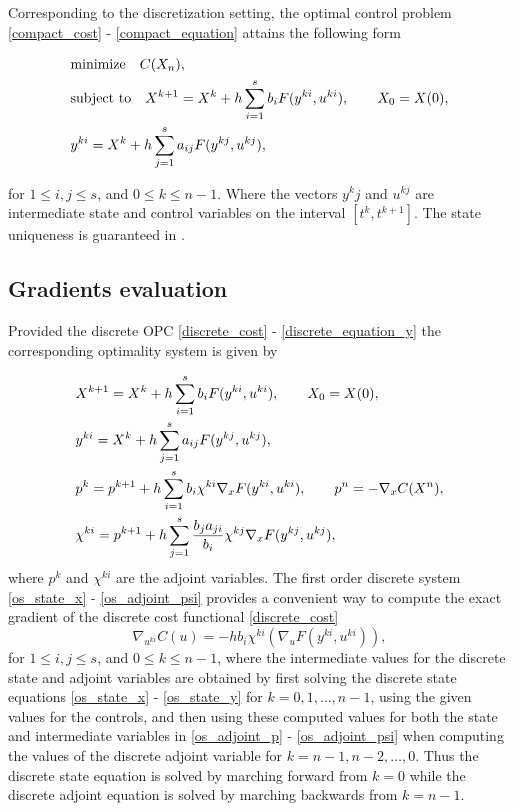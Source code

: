 \documentclass[a4paper, english]{article}
\newcommand{\D}{\displaystyle}
\begin{document}
 Corresponding to the discretization setting, the optimal control problem \eqref{compact_cost} -  \eqref{compact_equation}  attains the following form

 \begin{align}
  \D
  & \mbox{minimize}\quad C(X_n), \label{discrete_cost}\\
  & \mbox{subject to} \quad X^{k+1}  = X^k + h\sum_{i=1}^{s}b_iF(y^{ki}, u^{ki}), \qquad X_0 = X(0), \label{discrete_equation_x}\\
  & y^{ki} = X^k + h\sum_{j=1}^{s}a_{ij}F(y^{kj}, u^{kj}),\label{discrete_equation_y}
  \end{align}

 for $1\leq i, j\leq s$, and $0\leq k\leq n-1$.
 Where the vectors $y^kj$ and $u^{kj}$ are intermediate state and control variables on the interval $[t^k, t^{k+1}]$. The state uniqueness is guaranteed in \cite{Hager2000}.


\subsection{Gradients evaluation}
Provided the discrete OPC \eqref{discrete_cost} - \eqref{discrete_equation_y} the corresponding  optimality system  is given by

  \begin{align}
   \D
    & X^{k+1}  = X^k + h\sum_{i=1}^{s}b_iF(y^{ki}, u^{ki}), \qquad X_0 = X(0),   \label{os_state_x}\\
 	& y^{ki} = X^k + h\sum_{j=1}^{s}a_{ij}F(y^{kj}, u^{kj}),   \label{os_state_y}\\
 	& p^k = p^{k+1} + h\sum_{i=1}^{s}b_i \chi^{ki}\nabla_x F(y^{ki}, u^{ki}), \qquad p^n = - \nabla_xC(X^n),  \label{os_adjoint_p}\\
 	& \chi^{ki} = p^{k+1} + h\sum_{j=1}^{s} \frac{b_j a_{ji}}{b_i}\chi^{kj}\nabla_x F(y^{kj}, u^{kj}), \label{os_adjoint_psi}
   \end{align}
where $p^k$ and $\chi^{ki}$ are the adjoint variables.
The first order discrete system \eqref{os_state_x} - \eqref{os_adjoint_psi} provides a convenient way to compute the exact gradient of the discrete cost functional \eqref{discrete_cost}
\begin{equation}
\nabla_{u^{ki}} C(u) = -h b_i \chi^{ki} (\nabla_u F(y^{ki}, u^{ki})),
\label{discretegradient}
 \end{equation}
 for $1\leq i, j\leq s$, and $0\leq k\leq n-1$, where the intermediate values for the discrete state and adjoint variables are obtained by first
 solving the discrete state equations \eqref{os_state_x} - \eqref{os_state_y} for $k=0, 1, \dots, n-1$, using the given values for the controls, and then using these computed values for both the state and intermediate variables in \eqref{os_adjoint_p} - \eqref{os_adjoint_psi} when computing the values of the discrete adjoint variable for $k=n-1, n-2, \dots, 0$. Thus the discrete state equation is solved by marching forward from
 $ k = 0$ while the discrete adjoint equation is solved by marching backwards from $k = n-1$.
\end{document}

